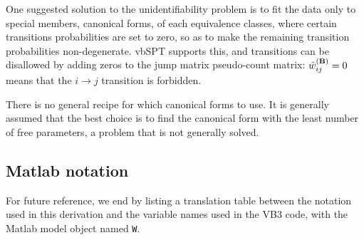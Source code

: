 One suggested solution to the unidentifiability problem is to fit the
data only to special members, canonical
forms\cite{Kienker1989,Bruno2005}, of each equivalence classes, where
certain transitions probabilities are set to zero, so as to make the
remaining transition probabilities non-degenerate. vbSPT supports
this, and transitions can be disallowed by adding zeros to the jump
matrix pseudo-count matrix: $\tilde w_{ij}^{(\mathbf{B})}=0$ means that
the $i\to j$ transition is forbidden. 

There is no general recipe for which canonical forms to use. It is
generally assumed that the best choice is to find the canonical form
with the least number of free parameters\cite{Kienker1989,Bruno2005},
a problem that is not generally solved.

\subsection{Matlab notation}
\label{Sec:matlabNotation}
For future reference, we end by listing a translation table between
the notation used in this derivation and the variable names used in
the VB3 code, with the Matlab model object named \texttt{W}.

